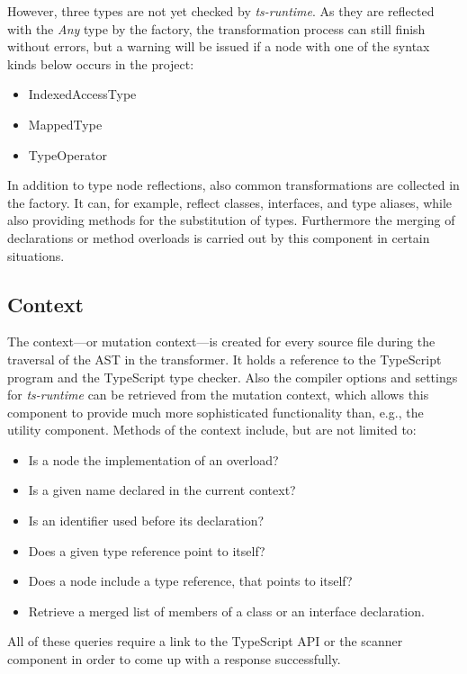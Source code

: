 However, three types are not yet checked by \emph{ts-runtime}. As they are reflected with the \emph{Any} type by the factory, the transformation process can still finish without errors, but a warning will be issued if a node with one of the syntax kinds below occurs in the project:
\begin{itemize}
  \item IndexedAccessType
  \item MappedType
  \item TypeOperator
\end{itemize}
In addition to type node reflections, also common transformations are collected in the factory. It can, for example, reflect classes, interfaces, and type aliases, while also providing methods for the substitution of types. Furthermore the merging of declarations or method overloads is carried out by this component in certain situations.

\subsection{Context}
\label{sec:context}

The context---or mutation context---is created for every source file during the traversal of the AST in the transformer. It holds a reference to the TypeScript program and the TypeScript type checker. Also the compiler options and settings for \emph{ts-runtime} can be retrieved from the mutation context, which allows this component to provide much more sophisticated functionality than, e.g., the utility component. Methods of the context include, but are not limited to:
\begin{itemize}
  \item Is a node the implementation of an overload?
  \item Is a given name declared in the current context?
  \item Is an identifier used before its declaration?
  \item Does a given type reference point to itself?
  \item Does a node include a type reference, that points to itself?
  \item Retrieve a merged list of members of a class or an interface declaration.
\end{itemize}
All of these queries require a link to the TypeScript API or the scanner component in order to come up with a response successfully.

